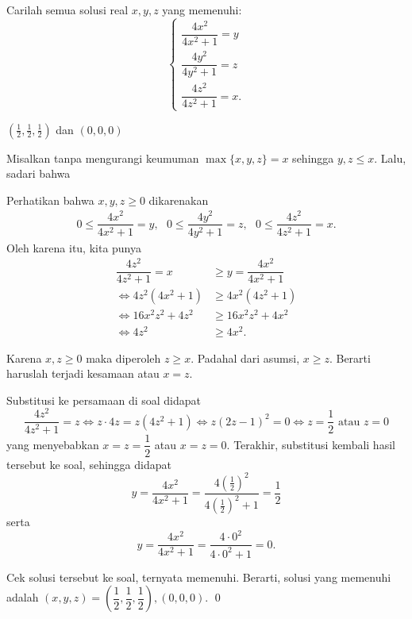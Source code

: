 \documentclass[11pt]{scrartcl}
\begin{document}
	
	\begin{soalbaru} 
		 Carilah semua solusi real  $x,y,z$ yang memenuhi: 
		 		$$\begin{cases}
		 		\dfrac{4x^2}{4x^2+1}=y \\[5pt]
		 		\dfrac{4y^2}{4y^2+1}=z \\[5pt]
		 		\dfrac{4z^2}{4z^2+1}=x.
		 		\end{cases}$$
		 		
		 \begin{jawaban}
		 $(\frac12,\frac12,\frac12)$ dan $(0,0,0)$
		 \end{jawaban}
		 \begin{solusi}
		 Misalkan tanpa mengurangi keumuman $\max\{x,y,z\}=x$ sehingga $y,z \le x$. Lalu, sadari bahwa 
		 
		 Perhatikan bahwa $x,y,z \ge 0$ dikarenakan
		 \begin{equation*}
		 		 \begin{split}
		 		 0\le\dfrac{4x^2}{4x^2+1}=y,\text{  }
		 		 0\le\dfrac{4y^2}{4y^2+1}=z,\text{  }
		 		 0\le\dfrac{4z^2}{4z^2+1}=x.
		 		 \end{split}
		 \end{equation*}
		 Oleh karena itu, kita punya
		 \begin{equation*}
		 \begin{split}
		 \dfrac{4z^2}{4z^2+1}=x &\ge y=\dfrac{4x^2}{4x^2+1}\\
		 \iff 4z^2(4x^2+1) &\ge 4x^2(4z^2+1)\\
		 \iff 16x^2z^2+4z^2 &\ge 16x^2z^2 + 4x^2\\
		 \iff 4z^2 &\ge 4x^2.
		 \end{split}
		 \end{equation*}
		 
		 Karena $x,z \ge 0$ maka diperoleh $z \ge x$. Padahal dari asumsi, $x \ge z$. Berarti haruslah terjadi kesamaan atau $x=z$. 
		 
		 Substitusi ke persamaan di soal didapat
		 $$\dfrac{4z^2}{4z^2+1}=z \iff z\cdot 4z=z(4z^2+1) \iff z(2z-1)^2=0 \iff z=\dfrac{1}{2} \text{ atau } z=0 $$
		 yang menyebabkan $x=z=\dfrac{1}{2}$ atau $x=z=0$. Terakhir, substitusi kembali hasil tersebut ke soal, sehingga didapat
		 $$y=\dfrac{4x^2}{4x^2+1}=\dfrac{4(\frac{1}{2})^2}{4(\frac{1}{2})^2+1}=\dfrac{1}{2}$$ serta $$y=\dfrac{4x^2}{4x^2+1}=\dfrac{4\cdot 0^2}{4 \cdot 0^2 +1}=0.$$
		 
		 Cek solusi tersebut ke soal, ternyata memenuhi. Berarti, solusi yang memenuhi adalah $(x,y,z)=\left(\dfrac{1}{2},\dfrac{1}{2},\dfrac{1}{2}\right),(0,0,0)$. \qed
		 \end{solusi}
	\end{soalbaru}
\end{document}

